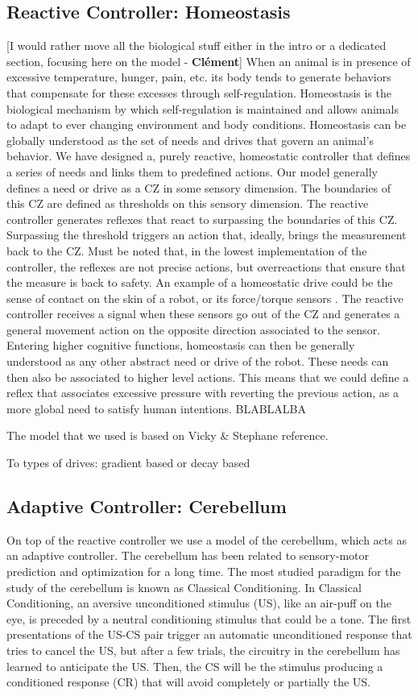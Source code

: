 \documentclass[letterpaper, 10 pt, conference]{ieeeconf}  %
\newcommand\cmf[1]{{\footnotesize \color{red}[#1 - \textbf{Cl\'ement}]}} %
\begin{document}
\subsection{Reactive Controller: Homeostasis}
\cmf{I would rather move all the biological stuff either in the intro or a dedicated section, focusing here on the model}
When an animal is in presence of excessive temperature, hunger, pain, etc. its body tends to generate behaviors that compensate for these excesses through self-regulation. Homeostasis is the biological mechanism by which self-regulation is maintained and allows animals to adapt to ever changing environment and body conditions. Homeostasis can be globally understood as the set of needs and drives that govern an animal's behavior. 
We have designed a, purely reactive, homeostatic controller that defines a series of needs and links them to predefined actions. Our model generally defines a need or drive as a CZ in some sensory dimension. The boundaries of this CZ are defined as thresholds on this sensory dimension. The reactive controller generates reflexes that react to surpassing the boundaries of this CZ.  Surpassing the threshold triggers an action that, ideally, brings the measurement back to the CZ. Must be noted that, in the lowest implementation of the controller, the reflexes are not precise actions, but overreactions that ensure that the measure is back to safety. An example of a homeostatic drive could be the sense of contact on the skin of a robot, or its force/torque sensors . The reactive controller receives a signal when these sensors go out of the CZ and generates a general movement action on the opposite direction associated to the sensor. 
Entering higher cognitive functions, homeostasis can then be generally understood as any other abstract need or drive of the robot. These needs can then also be associated to higher level actions. This means that we could define a reflex that associates excessive pressure with reverting the previous action, as a more global need to satisfy human intentions. BLABLALBA

The model that we used is based on Vicky \& Stephane reference.

To types of drives: gradient based or decay based

\subsection{Adaptive Controller: Cerebellum}

On top of the reactive controller we use a model of the cerebellum, which acts as an adaptive controller. The cerebellum has been related to sensory-motor prediction and optimization for a long time. The most studied paradigm for the study of the cerebellum is known as Classical Conditioning. In Classical Conditioning, an aversive unconditioned stimulus (US), like an air-puff on the eye, is preceded by a neutral conditioning stimulus that could be a tone. The first presentations of the US-CS pair trigger an automatic unconditioned response that tries to cancel the US, but after a few trials, the circuitry in the cerebellum has learned to anticipate the US. Then, the CS will be the stimulus producing a conditioned response (CR) that will avoid completely or partially the US.
\end{document}
